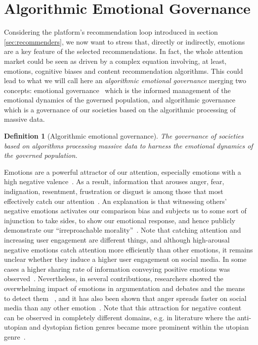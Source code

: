 \documentclass[10pt]{article}
\newtheorem{definition}{Definition}[section]
\begin{document}

\section{Algorithmic Emotional Governance}
\label{sec:emotions}

Considering the platform's recommendation loop introduced in section \ref{sec:recommenders}, we now want to stress that, directly or indirectly, emotions are a key feature of the selected recommendations. In fact, the whole attention market could be seen as driven by a complex equation involving, at least, emotions, cognitive biases and content recommendation algorithms. 
This could lead to what we will call here an \textit{algorithmic emotional governance} merging two concepts: emotional governance~\cite{richards2007emotional} which is the informed management of the emotional dynamics of the governed population,
and algorithmic governance~\cite{rouvroy2013gouvernementalite} which is a governance of our societies based on the algorithmic processing of massive data. %

\begin{definition}[Algorithmic emotional governance]
The governance of societies based on algorithms processing massive data to harness the emotional dynamics of the governed population.
\end{definition}

Emotions are a powerful attractor of our attention, 
especially emotions with a high negative valence~\cite{soroka_cross-national_2019}. As a result, information that arouses anger, fear, indignation, resentment, frustration or disgust is among those that most effectively catch our attention~\cite{robertson_negativity_2023,kohout_may_2023}.
An explanation is that witnessing others' negative emotions activates our comparison bias and subjects us to some sort of injunction to take sides, to show our emotional response, and hence publicly demonstrate our ``irreproachable morality''~\cite{crockett_moral_2017,bronner2021}.
%
Note that catching attention and increasing user engagement are different things, and although high-arousal negative emotions catch attention more efficiently than other emotions, it remains unclear whether they induce a higher user engagement on social media. In some cases a higher sharing rate of information conveying positive emotions was observed~\cite{keib_picture_2018,kramer_spread_2012}. 
%
Nevertheless, in several contributions,
researchers showed the overwhelming impact of emotions in argumentation and debates and the means to detect them ~\cite{BenlamineCVCFG15,VillataBCFG18,BasileCVFG16}, and it has also been shown that anger spreads faster on social media than any other emotion~\cite{fan_anger_2014}.
%
Note that this attraction for negative content can be observed in completely different domains, e.g. in literature where the anti-utopian and dystopian fiction genres became more prominent within the utopian genre~\cite{mascarell2020bibliometric}.
\end{document}
